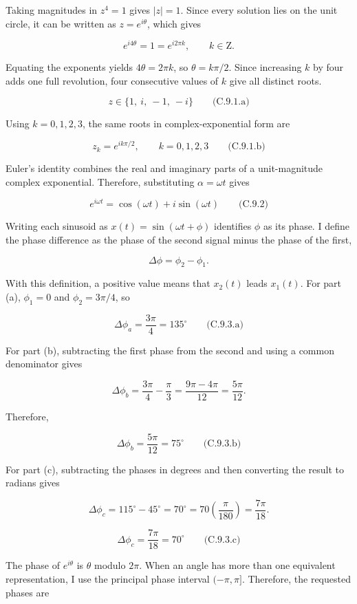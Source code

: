 Taking magnitudes in \(z^4=1\) gives \(\lvert z\rvert=1\). Since every solution lies on the unit circle, it can be written as \(z=e^{i\theta}\), which gives

\[
e^{i4\theta}=1=e^{i2\pi k},\qquad k\in\mathrm{Z}.
\]

Equating the exponents yields \(4\theta=2\pi k\), so \(\theta=k\pi/2\). Since increasing \(k\) by four adds one full revolution, four consecutive values of \(k\) give all distinct roots.

\[
\boxed{z\in\{1,\ i,\ -1,\ -i\}}
\qquad\text{(C.9.1.a)}
\]

Using \(k=0,1,2,3\), the same roots in complex-exponential form are

\[
\boxed{z_k=e^{ik\pi/2},\qquad k=0,1,2,3}
\qquad\text{(C.9.1.b)}
\]

Euler's identity combines the real and imaginary parts of a unit-magnitude complex exponential. Therefore, substituting \(\alpha=\omega t\) gives

\[
\boxed{e^{i\omega t}=\cos(\omega t)+i\sin(\omega t)}
\qquad\text{(C.9.2)}
\]

Writing each sinusoid as \(x(t)=\sin(\omega t+\phi)\) identifies \(\phi\) as its phase. I define the phase difference as the phase of the second signal minus the phase of the first,

\[
\Delta\phi=\phi_2-\phi_1.
\]

With this definition, a positive value means that \(x_2(t)\) leads \(x_1(t)\). For part (a), \(\phi_1=0\) and \(\phi_2=3\pi/4\), so

\[
\boxed{\Delta\phi_a=\frac{3\pi}{4}=135^\circ}
\qquad\text{(C.9.3.a)}
\]

For part (b), subtracting the first phase from the second and using a common denominator gives

\[
\Delta\phi_b=\frac{3\pi}{4}-\frac{\pi}{3}
=\frac{9\pi-4\pi}{12}=\frac{5\pi}{12}.
\]

Therefore,

\[
\boxed{\Delta\phi_b=\frac{5\pi}{12}=75^\circ}
\qquad\text{(C.9.3.b)}
\]

For part (c), subtracting the phases in degrees and then converting the result to radians gives

\[
\Delta\phi_c=115^\circ-45^\circ=70^\circ
=70\left(\frac{\pi}{180}\right)=\frac{7\pi}{18}.
\]

\[
\boxed{\Delta\phi_c=\frac{7\pi}{18}=70^\circ}
\qquad\text{(C.9.3.c)}
\]

The phase of \(e^{i\theta}\) is \(\theta\) modulo \(2\pi\). When an angle has more than one equivalent representation, I use the principal phase interval \((-\pi,\pi]\). Therefore, the requested phases are

